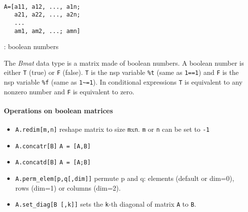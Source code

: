 
\begin{mandesc}
   \\
\end{mandesc}
\begin{calling_sequence}
\begin{verbatim}
A=[a11, a12, ..., a1n;
   a21, a22, ..., a2n;
   ...
   am1, am2, ...; amn]
\end{verbatim}
\end{calling_sequence}
\begin{parameters}
  \begin{varlist}
    : boolean numbers
  \end{varlist}
\end{parameters}

\begin{mandescription}
The \emph{Bmat} data type is a matrix made of boolean numbers. 
A boolean number is either \verb+T+ (true) or \verb+F+ (false). 
\verb+T+ is the nsp variable \verb+%t+ (same as \verb+1==1+)
and \verb+F+ is the nsp variable \verb+%f+ (same as \verb+1~=1+).
In conditional expressions \verb+T+ is equivalent to any nonzero
number and \verb+F+ is equivalent to zero.
\end{mandescription}

\paragraph{Operations on boolean matrices}
\begin{itemize}
\item \verb+A.redim[m,n]+ reshape matrix to size \verb+m+x\verb+n+. \verb+m+ or \verb+n+ can be set to \verb+-1+
\item \verb+A.concatr[B]+ \verb+A = [A,B]+
\item \verb+A.concatd[B]+ \verb+A = [A;B]+
\item \verb+A.perm_elem[p,q[,dim]]+ permute p and q: elements
  (default or dim=0), rows (dim=1) or columns (dim=2).
\item \verb+A.set_diag[B [,k]]+ sets the \verb+k+-th diagonal of matrix \verb+A+ to \verb+B+.
\end{itemize}

